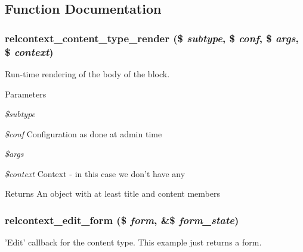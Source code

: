 \subsection{Function Documentation}
\hypertarget{relcontext__content__type_8inc_a690d16d488d0c123271bf95a68e57a9a}{
\subsubsection[{relcontext\_\-content\_\-type\_\-render}]{\setlength{\rightskip}{0pt plus 5cm}relcontext\_\-content\_\-type\_\-render (\$ {\em subtype}, \/  \$ {\em conf}, \/  \$ {\em args}, \/  \$ {\em context})}}
\label{relcontext__content__type_8inc_a690d16d488d0c123271bf95a68e57a9a}
Run-\/time rendering of the body of the block.


\begin{DoxyParams}{Parameters}
\item[{\em \$subtype}]\item[{\em \$conf}]Configuration as done at admin time \item[{\em \$args}]\item[{\em \$context}]Context -\/ in this case we don't have any\end{DoxyParams}
\begin{DoxyReturn}{Returns}
An object with at least title and content members 
\end{DoxyReturn}
\hypertarget{relcontext__content__type_8inc_adabdf26f4d7d168d989ccce9e0899fde}{
\subsubsection[{relcontext\_\-edit\_\-form}]{\setlength{\rightskip}{0pt plus 5cm}relcontext\_\-edit\_\-form (\$ {\em form}, \/  \&\$ {\em form\_\-state})}}
\label{relcontext__content__type_8inc_adabdf26f4d7d168d989ccce9e0899fde}
'Edit' callback for the content type. This example just returns a form. 

